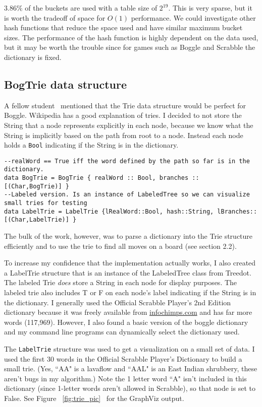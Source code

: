 \documentclass{article}
\begin{document}
$3.86 \%$ of the buckets are used with a table size of $2^{19}.$ This is very sparse, but it is worth the tradeoff of space for $O(1)$ performance. We could investigate other hash functions that reduce the space used and have similar maximum bucket sizes. The performance of the hash function is highly dependent on the data used, but it may be worth the trouble since for games such as Boggle and Scrabble the dictionary is fixed.

\subsection{BogTrie data structure} 
A fellow student \footnotemark \ mentioned that the Trie data structure would be perfect for Boggle. Wikipedia has a good explanation of tries. I decided to not store the String that a node represents explicitly in each node, because we know what the String is implicitly based on the path from root to a node. Instead each node holds a \verb=Bool= indicating if the String is in the dictionary. 

\begin{lstlisting}
--realWord == True iff the word defined by the path so far is in the dictionary.
data BogTrie = BogTrie { realWord :: Bool, branches :: [(Char,BogTrie)] } 
--Labeled version. Is an instance of LabeledTree so we can visualize small tries for testing
data LabelTrie = LabelTrie {lRealWord::Bool, hash::String, lBranches::[(Char,LabelTrie)] } 
\end{lstlisting}
The bulk of the work, however, was to parse a dictionary into the Trie structure efficiently and to use the trie to find all moves on a board (see section 2.2).   

To increase my confidence that the implementation actually works, I also created a LabelTrie structure that is an instance of the LabeledTree class from Treedot. The labeled Trie \emph{does} store a String in each node for display purposes. The labeled trie also includes T or F on each node's label indicating if the String is in the dictionary. I generally used the Official Scrabble Player's 2nd Edition dictionary because it was freely available from \url{infochimps.com} and has far more words (117,969). However, I also found a basic version of the boggle dictionary and my command line programs can dynamically select the dictionary used. 


The \verb=LabelTrie= structure was used to get a visualization on a small set of data. I used the first 30 words in the Official Scrabble Player's Dictionary to build a small trie. (Yes, ``AA" is a lavaflow and ``AAL" is an East Indian shrubbery, these aren't bugs in my algorithm.) Note the 1 letter word ``A" isn't included in this dictionary (since 1-letter words aren't allowed in Scrabble), so that node is set to False. See Figure ~\ref{fig:trie_pic} \ for the GraphViz output.
\end{document}
